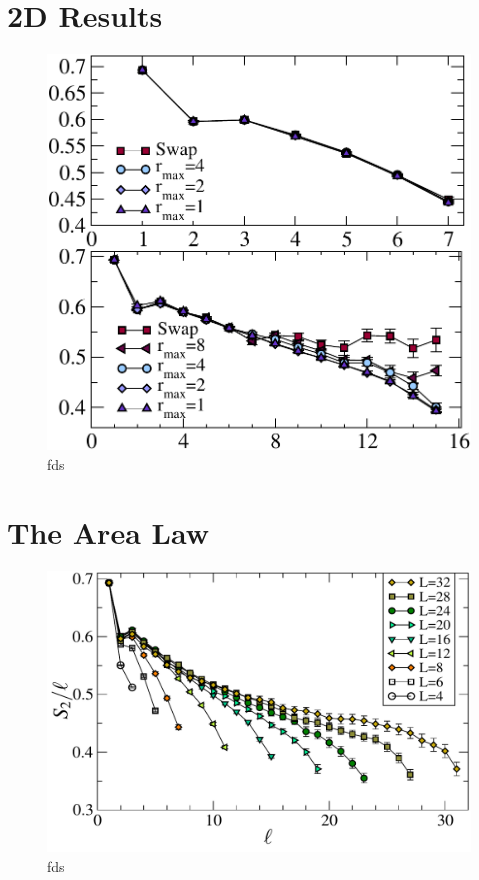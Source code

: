 \section{2D Results}

\begin{figure} {
	\includegraphics[width=5in]{./figures/paper2/fig_2DA/fig_L8n16.pdf} 
	\centering
	\caption[fds]{ fds
	\label{2Dfig}
	}
} \end{figure}

\section{The Area Law}

\begin{figure} {
	\includegraphics[width=5in]{./figures/paper2/fig_AreaL/fig4.pdf} 
	\centering
	\caption[fds]{ fds
	\label{2Dfig}
	}
} \end{figure}

